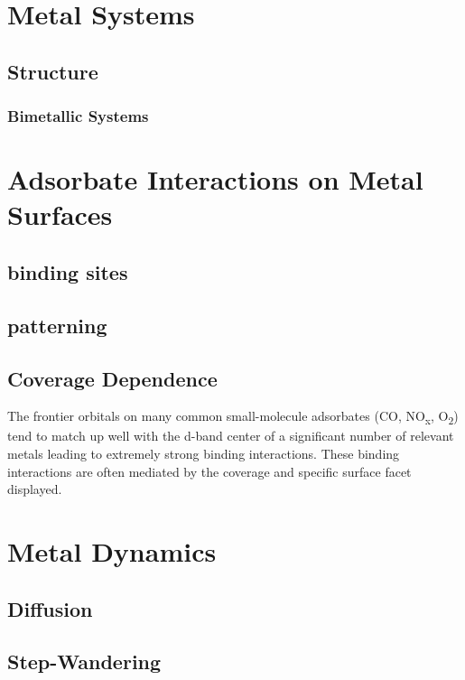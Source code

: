 
\section{Metal Systems}
\subsection{Structure}
\subsubsection{Bimetallic Systems}

\section{Adsorbate Interactions on Metal Surfaces}
\subsection{binding sites}
\subsection{patterning}
\subsection{Coverage Dependence}
The frontier orbitals on many common small-molecule adsorbates (CO,
NO\textsubscript{x}, O\textsubscript{2}) tend to match up well with the d-band
center of a significant number of relevant metals leading to extremely strong
binding interactions. These binding interactions are often mediated by the
coverage and specific surface facet displayed.

\section{Metal Dynamics}
\subsection{Diffusion}
\subsection{Step-Wandering}


